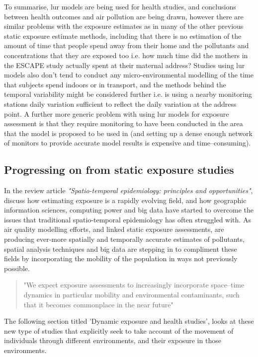 To summarise, \gls{lur} models are being used for health studies, and conclusions between health outcomes and air pollution are being drawn, however there are similar problems with the exposure estimates as in many of the other previous static exposure estimate methods, including that there is no estimation of the amount of time that people spend away from their home and the pollutants and concentrations that they are exposed too i.e. how much time did the mothers in the ESCAPE study actually spent at their maternal address? Studies using \gls{lur} models also don't tend to conduct any micro-environmental modelling of the time that subjects spend indoors or in transport, and the methods behind the temporal variability might be considered further i.e. is using a nearby monitoring stations daily variation sufficient to reflect the daily variation at the address point. A further more generic problem with using \gls{lur} models for exposure assessment is that they require monitoring to have been conducted in the area that the model is proposed to be used in (and setting up a dense enough network of monitors to provide accurate model results is expensive and time--consuming).


\subsection{Progressing on from static exposure studies}
\label{subsec:progressing_from_static}

In the review article \textit{"Spatio-temporal epidemiology: principles and opportunities"}, \cite{Meliker2011} discuss how estimating exposure is a rapidly evolving field, and how geographic information sciences, computing power and big data have started to overcome the issues that traditional spatio-temporal epidemiology has often struggled with. As air quality modelling efforts, and linked static exposure assessments, are producing ever-more spatially and temporally accurate estimates of pollutants, spatial analysis techniques and big data are stepping in to compliment these fields by incorporating the mobility of the population in ways not previously possible.

\begin{quote}
"We expect exposure assessments to increasingly incorporate space--time dynamics in particular mobility and environmental contaminants, such that it becomes commonplace in the near future" \cite{Meliker2011}
\end{quote}

The following section titled 'Dynamic exposure and health studies', looks at these new type of studies that explicitly seek to take account of the movement of individuals through different environments, and their exposure in those environments.

